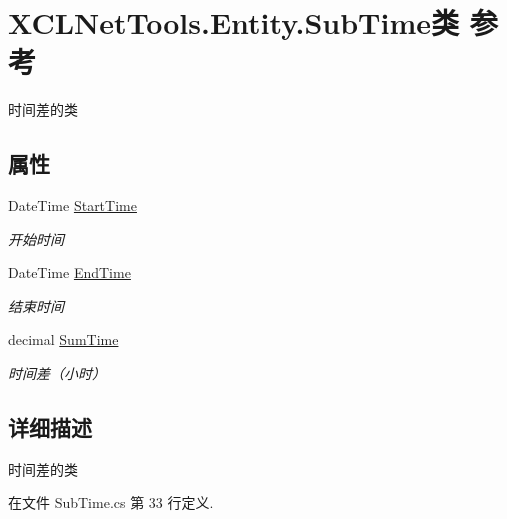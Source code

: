 \hypertarget{class_x_c_l_net_tools_1_1_entity_1_1_sub_time}{\section{X\-C\-L\-Net\-Tools.\-Entity.\-Sub\-Time类 参考}
\label{class_x_c_l_net_tools_1_1_entity_1_1_sub_time}
}


时间差的类  


\subsection*{属性}
\begin{DoxyCompactItemize}
\item 
Date\-Time \hyperlink{class_x_c_l_net_tools_1_1_entity_1_1_sub_time_a7813c7a0874535abbe0b5307d7310c27}{Start\-Time}
\begin{DoxyCompactList}\small\item\em 开始时间 \end{DoxyCompactList}\item 
Date\-Time \hyperlink{class_x_c_l_net_tools_1_1_entity_1_1_sub_time_a286d907d4beb9e6153f1abdb6f2c95fd}{End\-Time}
\begin{DoxyCompactList}\small\item\em 结束时间 \end{DoxyCompactList}\item 
decimal \hyperlink{class_x_c_l_net_tools_1_1_entity_1_1_sub_time_afe5aa74e0038c4b4342be84211c3f607}{Sum\-Time}
\begin{DoxyCompactList}\small\item\em 时间差（小时） \end{DoxyCompactList}\end{DoxyCompactItemize}


\subsection{详细描述}
时间差的类 



在文件 Sub\-Time.\-cs 第 33 行定义.



